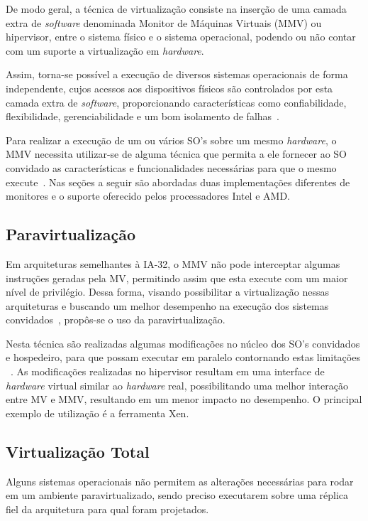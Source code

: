 \documentclass[times, 10pt,twocolumn]{article}
\def\sw{\textit{software}\xspace}
\def\hw{\textit{hardware}\xspace}
\def\hpv{hipervisor\xspace}
\begin{document}
De modo geral, a técnica de virtualização consiste na inserção de uma camada extra de \sw 
denominada Monitor de Máquinas Virtuais (MMV) ou \hpv, entre o sistema físico e o 
sistema operacional, podendo ou não contar com um suporte a virtualização em \hw. 

Assim, torna-se possível a execução de diversos sistemas operacionais 
de forma independente, cujos acessos aos dispositivos físicos são controlados por 
esta camada extra de \sw, proporcionando características como confiabilidade, 
flexibilidade, gerenciabilidade e um bom isolamento de falhas~\cite{goldberg}. 

Para realizar a execução de um ou vários  SO's sobre um mesmo \hw, o MMV necessita 
utilizar-se de alguma técnica que permita a ele fornecer ao SO convidado as 
características e funcionalidades necessárias para que o mesmo execute~\cite{mve}.
Nas seções a seguir são abordadas duas implementações diferentes de monitores
e o suporte oferecido pelos processadores Intel e AMD. 

\subsection{Paravirtualização}
Em arquiteturas semelhantes à IA-32, o MMV não pode interceptar algumas instruções 
geradas pela MV, permitindo assim que esta execute com um maior nível de privilégio. 
Dessa forma, visando possibilitar a virtualização nessas arquiteturas e buscando um 
melhor desempenho na execução dos sistemas convidados~\cite{tg-arthur}, propôs-se o 
uso da paravirtualização.

Nesta técnica são realizadas algumas modificações no núcleo dos SO's convidados e 
hospedeiro, para que possam executar em paralelo contornando estas limitações
~\cite{youseff2006phs}. As modificações realizadas no \hpv resultam em uma interface 
de \hw virtual similar ao \hw real, possibilitando uma melhor interação entre MV e 
MMV, resultando em um menor impacto no desempenho. O principal exemplo de utilização 
é a ferramenta Xen. 

\subsection{Virtualização Total}
Alguns sistemas operacionais não permitem as alterações necessárias para rodar em 
um ambiente paravirtualizado, sendo preciso executarem sobre uma réplica fiel
da arquitetura para qual foram projetados. 
\end{document}
